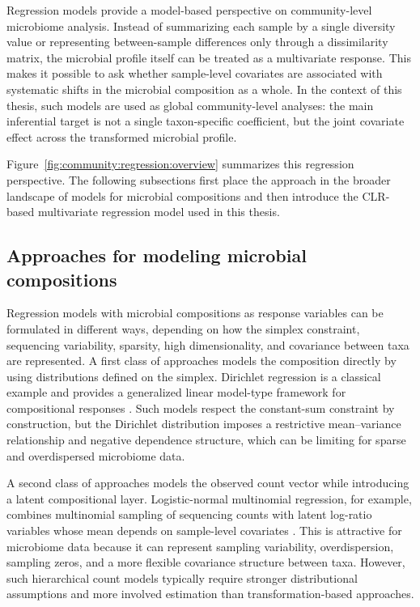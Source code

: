 Regression models provide a model-based perspective on community-level microbiome analysis. Instead of summarizing each sample by a single diversity value or representing between-sample differences only through a dissimilarity matrix, the microbial profile itself can be treated as a multivariate response. This makes it possible to ask whether sample-level covariates are associated with systematic shifts in the microbial composition as a whole. In the context of this thesis, such models are used as global community-level analyses: the main inferential target is not a single taxon-specific coefficient, but the joint covariate effect across the transformed microbial profile.

Figure~\ref{fig:community:regression:overview} summarizes this regression perspective. The following subsections first place the approach in the broader landscape of models for microbial compositions and then introduce the CLR-based multivariate regression model used in this thesis.

\subsection{Approaches for modeling microbial compositions}
\label{sec:3community:regression:approaches}

Regression models with microbial compositions as response variables can be formulated in different ways, depending on how the simplex constraint, sequencing variability, sparsity, high dimensionality, and covariance between taxa are represented. A first class of approaches models the composition directly by using distributions defined on the simplex. Dirichlet regression is a classical example and provides a generalized linear model-type framework for compositional responses \citep{maier2014dirichletreg}. Such models respect the constant-sum constraint by construction, but the Dirichlet distribution imposes a restrictive mean--variance relationship and negative dependence structure, which can be limiting for sparse and overdispersed microbiome data.

\newpage
A second class of approaches models the observed count vector while introducing a latent compositional layer. Logistic-normal multinomial regression, for example, combines multinomial sampling of sequencing counts with latent log-ratio variables whose mean depends on sample-level covariates \citep{xia2013logistic}. This is attractive for microbiome data because it can represent sampling variability, overdispersion, sampling zeros, and a more flexible covariance structure between taxa. However, such hierarchical count models typically require stronger distributional assumptions and more involved estimation than transformation-based approaches.

